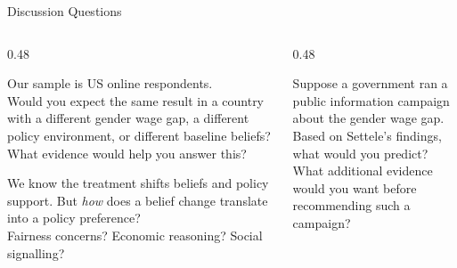 \documentclass[aspectratio=169, 11pt]{beamer}
\begin{document}

\begin{frame}[t]{Discussion Questions}
\vspace{0.3em}
\begin{columns}[T]
\begin{column}{0.48\textwidth}
\begin{examplebox}
Our sample is US online respondents.\\[0.3em]
Would you expect the same result in a country with a different gender wage gap, a different policy environment, or different baseline beliefs?\\[0.2em]
What evidence would help you answer this?
\end{examplebox}
\vspace{0.4em}
\begin{examplebox}[Q2: Mechanism]
We know the treatment shifts beliefs and policy support. But \emph{how} does a belief change translate into a policy preference?\\[0.2em]
Fairness concerns? Economic reasoning? Social signalling?
\end{examplebox}
\end{column}
\begin{column}{0.48\textwidth}
\begin{examplebox}
Suppose a government ran a public information campaign about the gender wage gap.\\[0.3em]
Based on Settele's findings, what would you predict?\\[0.2em]
What additional evidence would you want before recommending such a campaign?
\end{examplebox}
\end{column}
\end{columns}
\end{frame}

\end{document}
